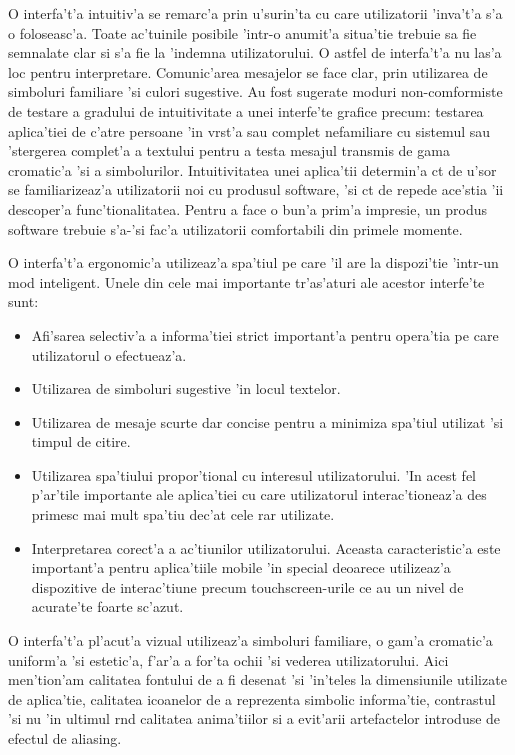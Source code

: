 O interfa't'a intuitiv'a se remarc'a prin u'surin'ta cu care utilizatorii 'inva't'a s'a o foloseasc'a. Toate ac'tuinile posibile 'intr-o anumit'a situa'tie trebuie sa fie semnalate clar si s'a fie la 'indem{\ia}na utilizatorului. O astfel de interfa't'a nu las'a loc pentru interpretare. Comunic'area mesajelor se face clar, prin utilizarea de simboluri familiare 'si culori sugestive. Au fost sugerate moduri non-comformiste de testare a gradului de intuitivitate a unei interfe'te grafice precum: testarea aplica'tiei de c'atre persoane 'in v{\ia}rst'a sau complet nefamiliare cu sistemul sau 'stergerea complet'a a textului pentru a testa mesajul transmis de gama cromatic'a 'si a simbolurilor. Intuitivitatea unei aplica'tii determin'a c{\ia}t de u'sor se familiarizeaz'a utilizatorii noi cu produsul software, 'si c{\ia}t de repede ace'stia 'ii descoper'a func'tionalitatea. Pentru a face o bun'a prim'a impresie, un produs software trebuie s'a-'si fac'a utilizatorii comfortabili din primele momente.

\medskip

O interfa't'a ergonomic'a utilizeaz'a spa'tiul pe care 'il are la dispozi'tie 'intr-un mod inteligent. Unele din cele mai importante tr'as'aturi ale acestor interfe'te sunt:
\begin{itemize}
\item Afi'sarea selectiv'a a informa'tiei strict important'a pentru opera'tia pe care utilizatorul o efectueaz'a.
\item Utilizarea de simboluri sugestive 'in locul textelor.
\item Utilizarea de mesaje scurte dar concise pentru a minimiza spa'tiul utilizat 'si timpul de citire.
\item Utilizarea spa'tiului propor'tional cu interesul utilizatorului. 'In acest fel p'ar'tile importante ale aplica'tiei cu care utilizatorul interac'tioneaz'a des primesc mai mult spa'tiu dec'at cele rar utilizate.
\item Interpretarea corect'a a ac'tiunilor utilizatorului. Aceasta caracteristic'a este important'a pentru aplica'tiile mobile 'in special deoarece utilizeaz'a dispozitive de interac'tiune precum touchscreen-urile ce au un nivel de acurate'te foarte sc'azut.
\end{itemize}

O interfa't'a pl'acut'a vizual utilizeaz'a simboluri familiare, o gam'a cromatic'a uniform'a 'si estetic'a, f'ar'a a for'ta ochii 'si vederea utilizatorului. Aici men'tion'am calitatea fontului de a fi desenat 'si 'in'teles la dimensiunile utilizate de aplica'tie, calitatea icoanelor de a reprezenta simbolic informa'tie, contrastul 'si nu 'in ultimul r{\ia}nd calitatea anima'tiilor si a evit'arii artefactelor introduse de efectul de aliasing.

